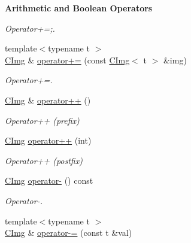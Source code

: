 \begin{Indent}{\bf Arithmetic and Boolean Operators}
\begin{DoxyCompactItemize}
\begin{DoxyCompactList}\small\item\em Operator+=;. \end{DoxyCompactList}\item 
\hypertarget{structcimg__library_1_1_c_img_a8450271a3f2ccd0c276c36f97da3b3a5}{{\footnotesize template$<$typename t $>$ }\\\hyperlink{structcimg__library_1_1_c_img}{C\-Img} \& \hyperlink{structcimg__library_1_1_c_img_a8450271a3f2ccd0c276c36f97da3b3a5}{operator+=} (const \hyperlink{structcimg__library_1_1_c_img}{C\-Img}$<$ t $>$ \&img)}\label{structcimg__library_1_1_c_img_a8450271a3f2ccd0c276c36f97da3b3a5}

\begin{DoxyCompactList}\small\item\em Operator+=. \end{DoxyCompactList}\item 
\hypertarget{structcimg__library_1_1_c_img_a2f9edea59a865e87f700a1bee8ba0622}{\hyperlink{structcimg__library_1_1_c_img}{C\-Img} \& \hyperlink{structcimg__library_1_1_c_img_a2f9edea59a865e87f700a1bee8ba0622}{operator++} ()}\label{structcimg__library_1_1_c_img_a2f9edea59a865e87f700a1bee8ba0622}

\begin{DoxyCompactList}\small\item\em Operator++ (prefix) \end{DoxyCompactList}\item 
\hypertarget{structcimg__library_1_1_c_img_aa166b3ab09f3a95c404816a109ca773b}{\hyperlink{structcimg__library_1_1_c_img}{C\-Img} \hyperlink{structcimg__library_1_1_c_img_aa166b3ab09f3a95c404816a109ca773b}{operator++} (int)}\label{structcimg__library_1_1_c_img_aa166b3ab09f3a95c404816a109ca773b}

\begin{DoxyCompactList}\small\item\em Operator++ (postfix) \end{DoxyCompactList}\item 
\hypertarget{structcimg__library_1_1_c_img_a2ed997930f52f369b422bedc6c56cc9c}{\hyperlink{structcimg__library_1_1_c_img}{C\-Img} \hyperlink{structcimg__library_1_1_c_img_a2ed997930f52f369b422bedc6c56cc9c}{operator-\/} () const }\label{structcimg__library_1_1_c_img_a2ed997930f52f369b422bedc6c56cc9c}

\begin{DoxyCompactList}\small\item\em Operator-\/. \end{DoxyCompactList}\item 
\hypertarget{structcimg__library_1_1_c_img_a2891862b2cde979fb00a095fc3827711}{{\footnotesize template$<$typename t $>$ }\\\hyperlink{structcimg__library_1_1_c_img}{C\-Img} \& \hyperlink{structcimg__library_1_1_c_img_a2891862b2cde979fb00a095fc3827711}{operator-\/=} (const t \&val)}\label{structcimg__library_1_1_c_img_a2891862b2cde979fb00a095fc3827711}


\end{DoxyCompactItemize}
\end{Indent}
